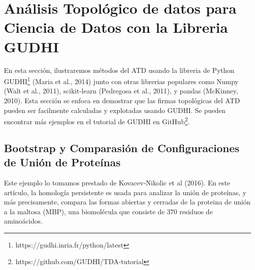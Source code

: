 \chapter{An\'alisis Topol\'ogico de datos para Ciencia de Datos con la Libreria GUDHI}

En esta secci\'on, ilustraremos m\'etodos del ATD usando la libreria de Python
GUDHI\footnote{https://gudhi.inria.fr/python/latest} (Maria et al., 2014\cite{Maria2014})
junto con otras librerias populares como Numpy (Walt et al., 2011\cite{Walt2011}),
scikit-learn (Pedregosa et al., 2011)\cite{Pedregosa2011},
y pandas (McKinney, 2010\cite{McKinney2010}).
Esta secci\'on se enfoca en demostrar que las firmas topol\'ogicas del ATD
pueden ser facilmente calculadas y explotadas usando GUDHI.
Se pueden encontrar m\'as ejemplos en el tutorial de GUDHI en
GitHub\footnote{https://github.com/GUDHI/TDA-tutorial}.\medskip\medskip

\section{Bootstrap y Comparasi\'on de Configuraciones de Uni\'on de Prote\'inas}

Este ejemplo lo tomamos prestado de Kovacev-Nikolic et al (2016)\cite{Kovacev2016}.
En este art\'iculo, la homolog\'ia persistente es usada para analizar la uni\'on de
prote\'inas, y m\'as precisamente, compara las formas abiertas y cerradas de la
proteina de uni\'on a la maltosa (MBP), una biomol\'ecula que consiste de
$370$ residuos de amino\'acidos.